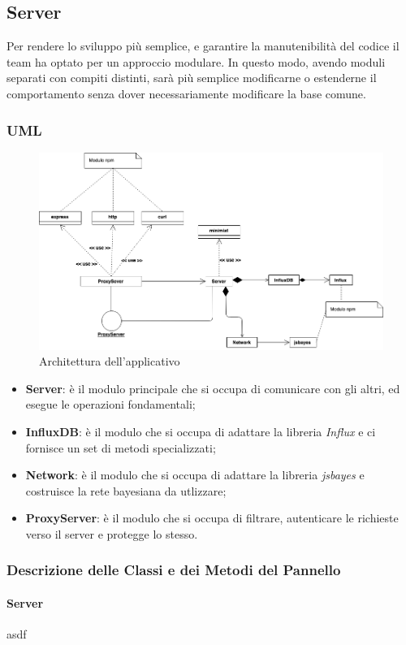 \subsection{Server}\label{archServer}
Per rendere lo sviluppo più semplice, e garantire la manutenibilità del codice il team ha optato per un approccio modulare. In questo modo, avendo moduli separati con compiti distinti, sarà più semplice modificarne o estenderne il comportamento senza dover necessariamente modificare la base comune.\\

\subsubsection{UML}
\begin{figure}[H]
	\begin{center}
		\includegraphics[scale=0.5]{./images/server_class_non_espanso.png} 
	\end{center}
	\caption{Architettura dell'applicativo}
\end{figure}

\begin{itemize}
 \item \textbf{Server}: è il modulo principale che si occupa di comunicare con gli altri, ed esegue le operazioni fondamentali;
 \item \textbf{InfluxDB}: è il modulo che si occupa di adattare la libreria \textit{Influx} e ci fornisce un set di metodi specializzati;
 \item \textbf{Network}: è il modulo che si occupa di adattare la libreria \textit{jsbayes} e costruisce la rete bayesiana da utlizzare;
 \item \textbf{ProxyServer}: è il modulo che si occupa di filtrare, autenticare le richieste verso il server e  protegge lo stesso.
\end{itemize}

\subsubsection{Descrizione delle Classi e dei Metodi del Pannello}

\paragraph{Server}

asdf